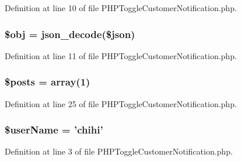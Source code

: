 Definition at line 10 of file P\-H\-P\-Toggle\-Customer\-Notification.\-php.

\hypertarget{_p_h_p_toggle_customer_notification_8php_a9008ed94ba185855b1723e367744b87e}{
\subsubsection[{\$obj}]{\setlength{\rightskip}{0pt plus 5cm}\$obj = json\-\_\-decode(\$json)}}\label{_p_h_p_toggle_customer_notification_8php_a9008ed94ba185855b1723e367744b87e}


Definition at line 11 of file P\-H\-P\-Toggle\-Customer\-Notification.\-php.

\hypertarget{_p_h_p_toggle_customer_notification_8php_a9f4cad5a721e7f7711fba0bf0f7ec273}{
\subsubsection[{\$posts}]{\setlength{\rightskip}{0pt plus 5cm}\$posts = array(1)}}\label{_p_h_p_toggle_customer_notification_8php_a9f4cad5a721e7f7711fba0bf0f7ec273}


Definition at line 25 of file P\-H\-P\-Toggle\-Customer\-Notification.\-php.

\hypertarget{_p_h_p_toggle_customer_notification_8php_aff20833df389a26c0f9384512eec4a68}{
\subsubsection[{\$user\-Name}]{\setlength{\rightskip}{0pt plus 5cm}\$user\-Name = 'chihi'}}\label{_p_h_p_toggle_customer_notification_8php_aff20833df389a26c0f9384512eec4a68}


Definition at line 3 of file P\-H\-P\-Toggle\-Customer\-Notification.\-php.

